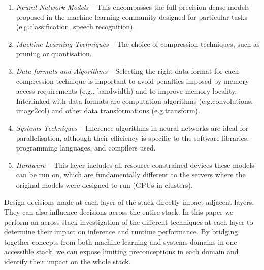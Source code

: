 \documentclass[conference]{IEEEtran}
\begin{document}
\begin{enumerate}

\item \textit{Neural Network Models} -- This encompasses the full-precision dense models proposed in the machine learning community designed for particular tasks (e.g.\image classification, speech recognition).  

\item \textit{Machine Learning Techniques} -- The choice of compression techniques, such as pruning or quantisation.

\item \textit{Data formats and Algorithms} -- Selecting the right data format for each compression technique is important to avoid penalties imposed by memory access requirements (e.g.\speed, bandwidth) and to improve memory locality. Interlinked with data formats are computation algorithms (e.g.\direct convolutions, image2col) and other data transformations (e.g.\Winograd transform).

\item \textit{Systems Techniques} -- Inference algorithms in neural networks are ideal for parallelisation, although their efficiency is specific to the software libraries, programming languages, and compilers used. 

\item \textit{Hardware} -- This layer includes all resource-constrained devices these models can be run on, which are fundamentally different to the servers where the original models were designed to run (GPUs in clusters).

\end{enumerate}

Design decisions made at each layer of the stack directly impact adjacent layers. They can also influence decisions across the entire stack. In this paper we perform an across-stack investigation of the different techniques at each layer to determine their impact on inference and runtime performance. By bridging together concepts from both machine learning and systems domains in one accessible stack, we can expose limiting preconceptions in each domain and identify their impact on the whole stack.
\end{document}
